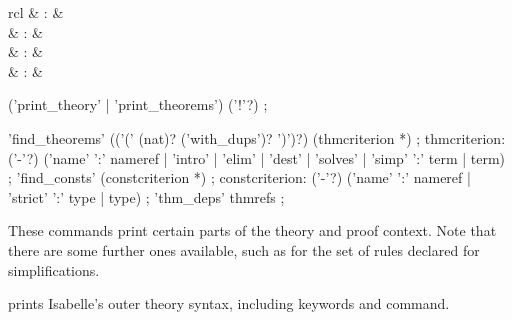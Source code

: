 \begin{isabellebody}
\begin{isamarkuptext}
\begin{matharray}{rcl}
    \hypertarget{command.find-consts}{\hyperlink{command.find-consts}{\mbox{}}}\isa{{\isachardoublequote}\isactrlsup {\isacharasterisk}{\isachardoublequote}} & : &  \\
    \hypertarget{command.thm-deps}{\hyperlink{command.thm-deps}{\mbox{}}}\isa{{\isachardoublequote}\isactrlsup {\isacharasterisk}{\isachardoublequote}} & : &  \\
    \hypertarget{command.print-facts}{\hyperlink{command.print-facts}{\mbox{}}}\isa{{\isachardoublequote}\isactrlsup {\isacharasterisk}{\isachardoublequote}} & : &  \\
    \hypertarget{command.print-binds}{\hyperlink{command.print-binds}{\mbox{}}}\isa{{\isachardoublequote}\isactrlsup {\isacharasterisk}{\isachardoublequote}} & : &  \\
  \end{matharray}

  \begin{rail}
    ('print_theory' | 'print_theorems') ('!'?)
    ;

    'find_theorems' (('(' (nat)? ('with_dups')? ')')?) (thmcriterion *)
    ;
    thmcriterion: ('-'?) ('name' ':' nameref | 'intro' | 'elim' | 'dest' |
      'solves' | 'simp' ':' term | term)
    ;
    'find_consts' (constcriterion *)
    ;
    constcriterion: ('-'?) ('name' ':' nameref | 'strict' ':' type | type)
    ;
    'thm_deps' thmrefs
    ;
  \end{rail}

  These commands print certain parts of the theory and proof context.
  Note that there are some further ones available, such as for the set
  of rules declared for simplifications.

  \begin{description}
  
  \item \hyperlink{command.print-commands}{\mbox{}} prints Isabelle's outer theory
  syntax, including keywords and command.
  

\end{description}
\end{isamarkuptext}
\end{isabellebody}
